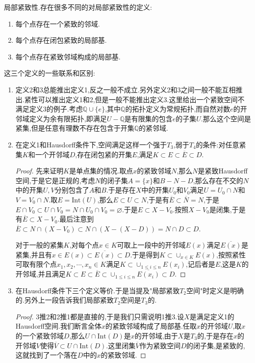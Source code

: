 局部紧致性.存在很多不同的对局部紧致性的定义:
\begin{enumerate}
	\item 每个点存在一个紧致的邻域.
	\item 每个点存在闭包紧致的局部基.
	\item 每个点存在紧致邻域构成的局部基.
\end{enumerate}

这三个定义的一些联系和区别:
\begin{enumerate}
	\item 定义2和3总能推出定义1,反之一般不成立.另外定义2和3之间一般不能互相推出.紧性可以推出定义1和2,但是一般不能推出定义3.这里给出一个紧致空间不满足定义3的例子.考虑$\mathbb{Q}\cup\{e\}$,其中$\mathbb{Q}$的拓扑定义为常规拓扑,而自然对数$e$的开邻域定义为余有限拓扑,即满足$U-\mathbb{Q}$是有限集的包含$e$的子集$U$.那么这个空间是紧集,但是任意有理数不存在包含于开集$\mathbb{Q}$的紧邻域.
	\item 在定义1和Hausdorff条件下,空间满足这样一个强于$T_3$,弱于$T_4$的条件:对任意紧集$K$和一个开邻域$D$,存在闭包紧的开集$E$,满足$K\subset E\subset\overline{E}\subset D$.
	\begin{proof}
		
		先来证明$K$是单点集的情况.取点$x$的紧致邻域$N$,那么$N$是紧致Hausdorff空间,于是它是正规的,考虑$N$的闭子集$A=\{x\}$和$B-N-D$,那么存在不交的$N$中的开集$U,V$分别包含了$A$和$B$.于是存在$X$中的开集$U_0$和$V_0$满足$U=U_0\cap N$和$V=V_0\cap N$.取$E=\mathrm{Int}(U)$,那么$E\subset U\subset N$,于是有$\overline{E}\subset\overline{N}=N$,于是$E\cap V_0\subset U\cap V_0=N\cap U_0\cap V_0=\varnothing$.于是$E\subset X-V_0$.按照$X-V_0$是闭集,于是有$\overline{E}\subset X-V_0$.最后注意到$\overline{E}\subset N\cap(X-V_0)\subset N\cap(X-(X-D))=N\cap D\subset D$.
		
		对于一般的紧集$K$,对每个点$x\in K$可取上一段中的开邻域$E(x)$满足$\overline{E(x)}$是紧集,并且有$x\in E(x)\subset\overline{E(x)}\subset D$.于是得到$K\subset\cup_{x\in K}E(x)$,按照紧性可取有限个点$x_1,x_2,\cdots,x_n\in K$满足$K\subset\cup_{1\le i\le n}E(x_i)$,记后者是$E$,这是$K$的开邻域,并且满足$K\subset E\subset\overline{E}\subset\cup_{1\le i\le n}\overline{E(x_i)}\subset D$.
	\end{proof}
	\item 
	 在Hausdorff条件下三个定义等价.于是当提及"局部紧致$T_2$空间"时定义是明确的.另外上一段告诉我们局部紧致$T_2$空间是$T_3$的.
	 \begin{proof}
	 	
	 	3推2和2推1都是直接的,于是我们只需说明1推3.设$X$是满足定义1的Hausdorff空间.我们断言全体$x$的紧致邻域构成了局部基.任取$x$的开邻域$U$,取$x$的一个紧致邻域$D$,那么$U\cap\mathrm{Int}(D)$是$x$的开邻域,由于$X$是$T_3$的,于是存在$x$的开邻域$V$使得$\overline{V}\subset U\cap\mathrm{Int}(D)$.这里闭集$\overline{V}$作为紧致空间$D$的闭子集,是紧致的,这就找到了一个落在$D$中的$x$的紧致邻域.
	 \end{proof}
\end{enumerate}

